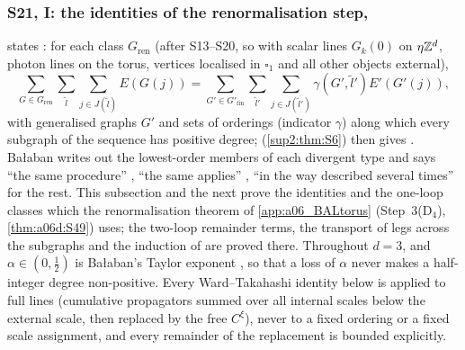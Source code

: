 
\subsubsection{S21, I: the identities of the renormalisation step, \cite[pp.~434--445]{Ba3}}\label{sup4:ssec:S21a}

\cite[p.~434]{Ba3} states \cite[(3.5)]{Ba3}: for each class $G_{\mathrm{ren}}$ (after S13--S20, so with scalar lines $G_k(0)$ on $\eta\mathbb Z^d$, photon lines on the torus, vertices localised in $\square_1$ and all other objects external),
\[
\sum_{G\in G_{\mathrm{ren}}}\sum_{\tilde l}\sum_{j\in J(\tilde l)}E(G(j))=\sum_{G'\in G'_{\mathrm{fin}}}\sum_{\tilde l'}\sum_{j\in J(\tilde l')}\gamma(G',\tilde l')E'(G'(j)),
\]
with generalised graphs $G'$ and sets of orderings (indicator $\gamma$) along which every subgraph of the sequence has positive degree; \cite[Prop.~2.2]{Ba3} (\cref{sup2:thm:S6}) then gives \cite[(3.3)]{Ba3}. Ba{\l}aban writes out the lowest-order members of each divergent type and says ``the same procedure'' \cite[p.~438]{Ba3}, ``the same applies'' \cite[p.~437]{Ba3}, ``in the way described several times'' \cite[p.~444]{Ba3} for the rest. This subsection and the next prove the identities and the one-loop classes which the renormalisation theorem of \cref{app:a06_BALtorus} (Step~3(D$_4$), \cref{thm:a06d:S49}) uses; the two-loop remainder terms, the transport of legs across the subgraphs \cite[(2.4)]{Ba3} and the induction of \cite[pp.~444--445]{Ba3} are proved there. Throughout $d=3$, and $\alpha\in(0,\frac12)$ is Ba{\l}aban's Taylor exponent \cite[p.~435]{Ba3}, so that a loss of $\alpha$ never makes a half-integer degree non-positive. Every Ward--Takahashi identity below is applied to full lines (cumulative propagators summed over all internal scales below the external scale, then replaced by the free $C^\xi$), never to a fixed ordering or a fixed scale assignment, and every remainder of the replacement is bounded explicitly.

